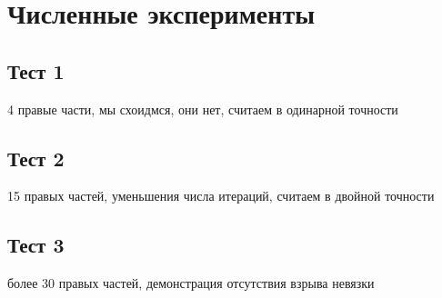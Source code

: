 \section{Численные эксперименты}
\label{sec:Chapter4} 

\subsection{Тест 1}
4 правые части, мы схоидмся, они нет, считаем в одинарной точности
\subsection{Тест 2}
15 правых частей, уменьшения числа итераций, считаем в двойной точности
\subsection{Тест 3}
более 30 правых частей, демонстрация отсутствия взрыва невязки

\newpage
